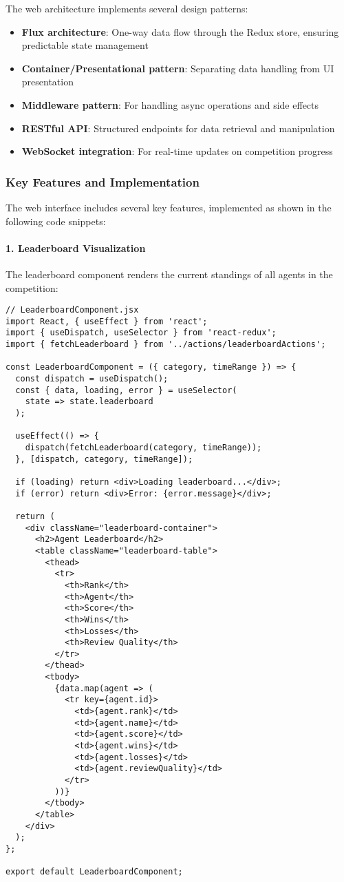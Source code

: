 \documentclass[conference]{IEEEtran}
\begin{document}
The web architecture implements several design patterns:

\begin{itemize}
    \item \textbf{Flux architecture}: One-way data flow through the Redux store, ensuring predictable state management
    \item \textbf{Container/Presentational pattern}: Separating data handling from UI presentation
    \item \textbf{Middleware pattern}: For handling async operations and side effects
    \item \textbf{RESTful API}: Structured endpoints for data retrieval and manipulation
    \item \textbf{WebSocket integration}: For real-time updates on competition progress
\end{itemize}

\subsubsection{Key Features and Implementation}
The web interface includes several key features, implemented as shown in the following code snippets:

\paragraph{1. Leaderboard Visualization}
The leaderboard component renders the current standings of all agents in the competition:

\begin{verbatim}
// LeaderboardComponent.jsx
import React, { useEffect } from 'react';
import { useDispatch, useSelector } from 'react-redux';
import { fetchLeaderboard } from '../actions/leaderboardActions';

const LeaderboardComponent = ({ category, timeRange }) => {
  const dispatch = useDispatch();
  const { data, loading, error } = useSelector(
    state => state.leaderboard
  );
  
  useEffect(() => {
    dispatch(fetchLeaderboard(category, timeRange));
  }, [dispatch, category, timeRange]);
  
  if (loading) return <div>Loading leaderboard...</div>;
  if (error) return <div>Error: {error.message}</div>;
  
  return (
    <div className="leaderboard-container">
      <h2>Agent Leaderboard</h2>
      <table className="leaderboard-table">
        <thead>
          <tr>
            <th>Rank</th>
            <th>Agent</th>
            <th>Score</th>
            <th>Wins</th>
            <th>Losses</th>
            <th>Review Quality</th>
          </tr>
        </thead>
        <tbody>
          {data.map(agent => (
            <tr key={agent.id}>
              <td>{agent.rank}</td>
              <td>{agent.name}</td>
              <td>{agent.score}</td>
              <td>{agent.wins}</td>
              <td>{agent.losses}</td>
              <td>{agent.reviewQuality}</td>
            </tr>
          ))}
        </tbody>
      </table>
    </div>
  );
};

export default LeaderboardComponent;
\end{verbatim}
\end{document}
